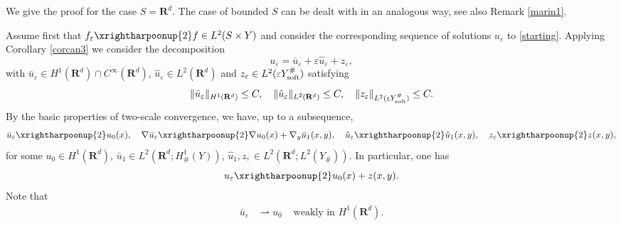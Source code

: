 \documentclass[11pt]{article}
\newcommand\e {\varepsilon}
\newcommand\soft{{\rm soft}}
\def\RR{\R}
\newcommand{\R}{\mathbf{R}}
\newcommand\wtto{\xrightharpoonup{2}}
\theoremstyle{remark}
\begin{document}
We give the proof for the case $S=\mathbf{R}^d$. The case of bounded $S$  can be dealt with in an analogous way, see also Remark \ref{marin1}.

Assume first that $f_\e \wtto f \in L^2(S\times Y)$ and consider the corresponding sequence of solutions $u_\e$  to \eqref{starting}. Applying Corollary \ref{corcan3} we
consider the decomposition
\begin{equation} \label{decomp1}
 u_\e  = \bar{u}_\e +\e \hat{u}_\e +z_\e ,
 \end{equation}
with 	$\bar{u}_\e  \in H^1(\RR^d)\cap C^\infty(\R^d)$, $\hat{u}_\e  \in L^2(\RR^d)$ and $z_\e \in L^2(\e Y_\soft^\#)$ satisfying
\begin{equation} \|\bar{u}_\e \|_{H^1(\RR^d)} \leq C, \quad\|\hat{u}_\e \|_{L^2(\RR^d)} \leq C, \quad \|z_\e \|_{L^2(\e Y_\soft^\#)} \leq C.  
\end{equation}
By the basic properties of two-scale convergence, we have, up to a subsequence,
\begin{equation}\label{52}
	\bar{u}_\e  \xrightharpoonup{2} u_0(x),\quad \nabla  \bar{u}_\e  \xrightharpoonup{2} \nabla u_0(x)+\nabla_y \bar{u}_1(x,y),\quad  \hat{u}_\e \xrightharpoonup{2} \hat{u}_1(x,y), \quad z_\e  \xrightharpoonup{2} z(x,y),
\end{equation}
for some $u_0\in H^1(\R^d)$, $\bar{u}_1 \in L^2(\R^d;H^1_\#(Y))$, $\hat{u}_1, z, \in L^2(\R^d;L^2(Y_\#))$.  In particular, one has
$$u_\e \xrightharpoonup{2} u_0(x) +z(x,y).  $$
Note that
\begin{eqnarray*}
		\bar u_\e &\rightharpoonup u_0& \mbox{ weakly  in } H^1(\R^d).
\end{eqnarray*}
\end{document}
